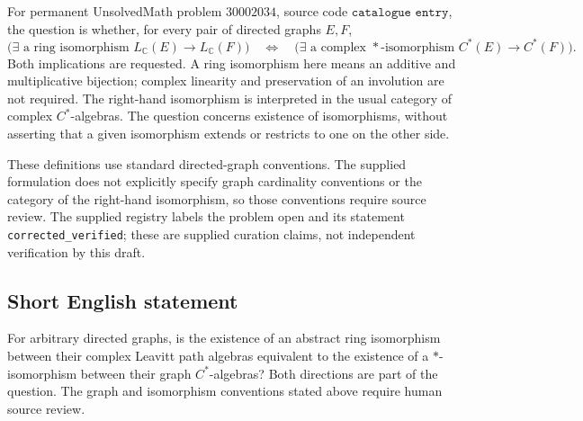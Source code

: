 \documentclass[11pt]{article}
\newcommand{\C}{\mathbb{C}}
\begin{document}
For permanent UnsolvedMath problem \(30002034\), source code \(\texttt{catalogue entry}\), the question is whether, for every pair of directed graphs \(E,F\),
\[
\bigl(\exists\text{ a ring isomorphism }L_{\C}(E)\longrightarrow L_{\C}(F)\bigr)
\quad\Longleftrightarrow\quad
\bigl(\exists\text{ a complex }{*}\text{-isomorphism }C^*(E)\longrightarrow C^*(F)\bigr).
\]
Both implications are requested. A ring isomorphism here means an additive and multiplicative bijection; complex linearity and preservation of an involution are not required. The right-hand isomorphism is interpreted in the usual category of complex \(C^*\)-algebras. The question concerns existence of isomorphisms, without asserting that a given isomorphism extends or restricts to one on the other side.

These definitions use standard directed-graph conventions. The supplied formulation does not explicitly specify graph cardinality conventions or the category of the right-hand isomorphism, so those conventions require source review. The supplied registry labels the problem open and its statement \texttt{corrected\_verified}; these are supplied curation claims, not independent verification by this draft.
\subsection{Short English statement}
For arbitrary directed graphs, is the existence of an abstract ring isomorphism between their complex Leavitt path algebras equivalent to the existence of a \({*}\)-isomorphism between their graph \(C^*\)-algebras? Both directions are part of the question. The graph and isomorphism conventions stated above require human source review.
\end{document}
